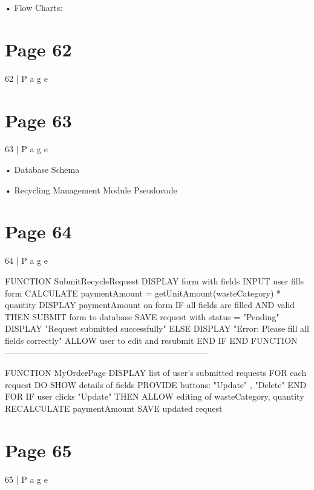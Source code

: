 \documentclass{article}
\begin{document}
• Flow Charts:    
 
 
 
 


\section*{Page 62}
62 | P a g e 
 
                                 
 


\section*{Page 63}
63 | P a g e 
 
• Database Schema 
   
     
     
 
 
 
 
 
 
• Recycling Management Module Pseudocode 
 


\section*{Page 64}
64 | P a g e 
 
FUNCTION SubmitRecycleRequest 
    DISPLAY form with fields 
    INPUT user fills form 
    CALCULATE paymentAmount = getUnitAmount(wasteCategory) * quantity 
    DISPLAY paymentAmount on form 
    IF all fields are filled AND valid THEN 
        SUBMIT form to database 
        SAVE request with status = "Pending" 
        DISPLAY "Request submitted successfully" 
    ELSE 
        DISPLAY "Error: Please fill all fields correctly" 
        ALLOW user to edit and resubmit 
    END IF 
END FUNCTION 
------------------------------------------------------------------------ 
 
FUNCTION MyOrderPage 
    DISPLAY list of user’s submitted requests 
    FOR each request DO 
        SHOW details of fields 
        PROVIDE buttons: "Update" , "Delete" 
    END FOR 
    IF user clicks "Update" THEN 
        ALLOW editing of wasteCategory, quantity 
        RECALCULATE paymentAmount 
        SAVE updated request 

\section*{Page 65}
65 | P a g e 
 
\end{document}
